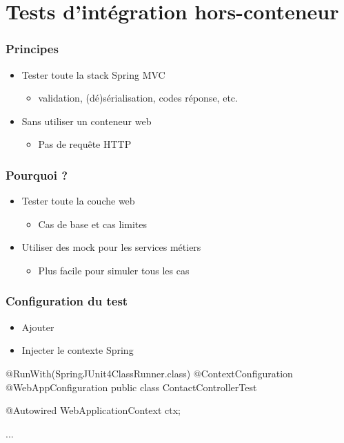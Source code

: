 \section{Tests d'intégration hors-conteneur}


\begin{frame}
 \frametitle{Principes}
 \begin{itemize}
  \item Tester toute la stack Spring MVC
  \begin{itemize}
   \item validation, (dé)sérialisation, codes réponse, etc.
  \end{itemize}
  \item Sans utiliser un conteneur web
  \begin{itemize}
   \item Pas de requête HTTP
  \end{itemize}
 \end{itemize}
\end{frame}

\begin{frame}
 \frametitle{Pourquoi ?}

 \begin{itemize}
  \item Tester toute la couche web
  \begin{itemize}
   \item Cas de base et cas limites
  \end{itemize}
  \item Utiliser des mock pour les services métiers
  \begin{itemize}
   \item Plus facile pour simuler tous les cas
  \end{itemize}
 \end{itemize}

\end{frame}

\begin{frame}[fragile]
 \frametitle{Configuration du test}

 \begin{itemize}
  \item Ajouter 
  \item Injecter le contexte Spring
 \end{itemize}


 \begin{javacode}
@RunWith(SpringJUnit4ClassRunner.class)
@ContextConfiguration
@WebAppConfiguration
public class ContactControllerTest {

  @Autowired
  WebApplicationContext ctx;

  ...
}
 \end{javacode}

\end{frame}


